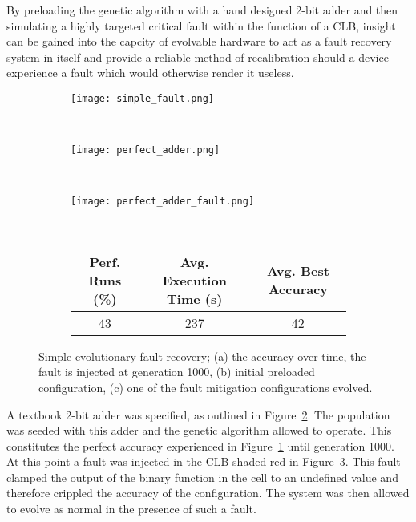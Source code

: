 By preloading the genetic algorithm with a hand designed 2-bit adder
and then
simulating a highly targeted critical fault within the function of a CLB, insight
can be gained into the capcity of evolvable hardware to act as a fault recovery
system in itself and provide a reliable method of recalibration should a device
experience a fault which would otherwise render it useless.

\begin{figure}
	\centering
	\begin{subfigure}[ht]{0.49\textwidth}
		\texttt{[image: simple\_fault.png]}
		\caption{}
		\label{fig:fault}
		\vspace{1em}
	\end{subfigure}
	\\
	\begin{subfigure}[ht]{0.49\textwidth}
		\texttt{[image: perfect\_adder.png]}
		\caption{}
		\label{fig:perf}
		\vspace{1em}
	\end{subfigure}
	~
	\begin{subfigure}[ht]{0.49\textwidth}
		\texttt{[image: perfect\_adder\_fault.png]}
		\caption{}
		\label{fig:recov}
		\vspace{1em}
	\end{subfigure}
	~
	\begin{subfigure}[ht]{\textwidth}
		\centering
		\begin{tabular}{ccc}
			\toprule
			\bfseries{Perf. Runs (\%)} &
			\bfseries{Avg. Execution Time (s)} & \bfseries{Avg. Best Accuracy}\\
			\midrule
			43 & 237 & 42 \\
			\bottomrule
		\end{tabular}
	\end{subfigure}
	\caption[Simple evolutionary fault recovery]{Simple evolutionary fault recovery;
	(a) the accuracy over time, the fault is injected at generation 1000,
	(b) initial preloaded configuration,
	(c) one of the fault mitigation configurations evolved.}
	\label{fig:simple_fault}
\end{figure}

A textbook 2-bit adder was specified, as outlined in Figure~\ref{fig:perf}. The
population was seeded with this adder and the genetic algorithm allowed to operate.
This constitutes the perfect accuracy experienced in Figure~\ref{fig:fault} until generation
1000.
At this point a fault was injected in the CLB shaded red in Figure~\ref{fig:recov}.
This fault clamped the output of the binary function in the cell to an undefined
value and therefore crippled the accuracy of the configuration. The system was then
allowed to evolve as normal in the presence of such a fault.

